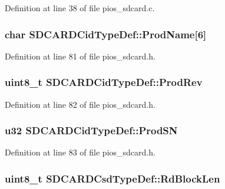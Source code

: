 \-Definition at line 38 of file pios\-\_\-sdcard.\-c.

\hypertarget{group___p_i_o_s___s_d_c_a_r_d_gad17afffd675a78059aa60101165d709d}{
\subsubsection[{\-Prod\-Name}]{\setlength{\rightskip}{0pt plus 5cm}char {\bf \-S\-D\-C\-A\-R\-D\-Cid\-Type\-Def\-::\-Prod\-Name}\mbox{[}6\mbox{]}}}\label{group___p_i_o_s___s_d_c_a_r_d_gad17afffd675a78059aa60101165d709d}


\-Definition at line 81 of file pios\-\_\-sdcard.\-h.

\hypertarget{group___p_i_o_s___s_d_c_a_r_d_ga8307b63b043ed01d0fa11493c9508dac}{
\subsubsection[{\-Prod\-Rev}]{\setlength{\rightskip}{0pt plus 5cm}uint8\-\_\-t {\bf \-S\-D\-C\-A\-R\-D\-Cid\-Type\-Def\-::\-Prod\-Rev}}}\label{group___p_i_o_s___s_d_c_a_r_d_ga8307b63b043ed01d0fa11493c9508dac}


\-Definition at line 82 of file pios\-\_\-sdcard.\-h.

\hypertarget{group___p_i_o_s___s_d_c_a_r_d_ga243ea864815caa90de7e151c8d8a7195}{
\subsubsection[{\-Prod\-S\-N}]{\setlength{\rightskip}{0pt plus 5cm}u32 {\bf \-S\-D\-C\-A\-R\-D\-Cid\-Type\-Def\-::\-Prod\-S\-N}}}\label{group___p_i_o_s___s_d_c_a_r_d_ga243ea864815caa90de7e151c8d8a7195}


\-Definition at line 83 of file pios\-\_\-sdcard.\-h.

\hypertarget{group___p_i_o_s___s_d_c_a_r_d_gab4a98c4b27e0e4cbb4ace4d6ff93c056}{
\subsubsection[{\-Rd\-Block\-Len}]{\setlength{\rightskip}{0pt plus 5cm}uint8\-\_\-t {\bf \-S\-D\-C\-A\-R\-D\-Csd\-Type\-Def\-::\-Rd\-Block\-Len}}}\label{group___p_i_o_s___s_d_c_a_r_d_gab4a98c4b27e0e4cbb4ace4d6ff93c056}


